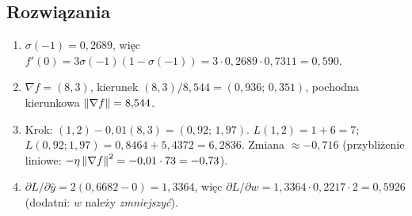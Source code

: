 \subsection*{Rozwiązania}
\begin{enumerate}
\item $\sigma(-1)=0{,}2689$, więc $f'(0)=3\sigma(-1)(1-\sigma(-1))=3\cdot0{,}2689\cdot0{,}7311=0{,}590$.
\item $\nabla f=(8,3)$, kierunek $(8,3)/8{,}544=(0{,}936;\,0{,}351)$, pochodna kierunkowa $\left\lVert \nabla f\right\rVert=8{,}544$.
\item Krok: $(1,2)-0{,}01(8,3)=(0{,}92;\,1{,}97)$. $L(1,2)=1+6=7$; $L(0{,}92;1{,}97)=0{,}8464+5{,}4372=6{,}2836$. Zmiana $\approx-0{,}716$ (przybliżenie liniowe: $-\eta\left\lVert \nabla f\right\rVert^2=-0{,}01\cdot73=-0{,}73$).
\item $\partial L/\partial\hat y=2(0{,}6682-0)=1{,}3364$, więc $\partial L/\partial w=1{,}3364\cdot0{,}2217\cdot2=0{,}5926$ (dodatni: $w$ należy \emph{zmniejszyć}).
\end{enumerate}
